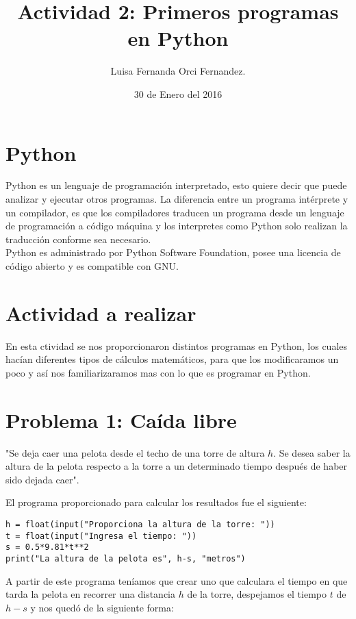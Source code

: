 \documentclass[12pt,letterpaper]{article}
\begin{document}
\title{Actividad 2: Primeros programas en Python}
\author{Luisa Fernanda Orci Fernandez.}
\date{30 de Enero del 2016}

\maketitle

\section*{Python}

Python es un lenguaje de programación interpretado, esto quiere decir que puede analizar y ejecutar otros programas. La diferencia entre un programa intérprete y un compilador, es que los compiladores traducen un programa desde un lenguaje de programación a código máquina y los interpretes como Python solo realizan la traducción conforme sea necesario. \\
Python es administrado por Python Software Foundation, posee una licencia de código abierto y es compatible con GNU. 

\section*{Actividad a realizar}

En esta ctividad se nos proporcionaron distintos programas en Python, los cuales hacían diferentes tipos de cálculos matemáticos, para que los modificaramos un poco y así nos familiarizaramos mas con lo que es programar en Python.


\section{Problema 1: Caída libre}

"Se deja caer una pelota desde el techo de una torre de altura $h$. Se desea saber la altura de la pelota respecto a la torre a un determinado tiempo después de haber sido dejada caer".

El programa proporcionado para calcular los resultados fue el siguiente: 

\begin{verbatim}
h = float(input("Proporciona la altura de la torre: "))
t = float(input("Ingresa el tiempo: "))
s = 0.5*9.81*t**2
print("La altura de la pelota es", h-s, "metros")
\end{verbatim}

A partir de este programa teníamos que crear uno que calculara el tiempo en que tarda la pelota en recorrer una distancia $h$ de la torre, despejamos el tiempo $t$ de $h-s$ y nos quedó de la siguiente forma:
\end{document}
